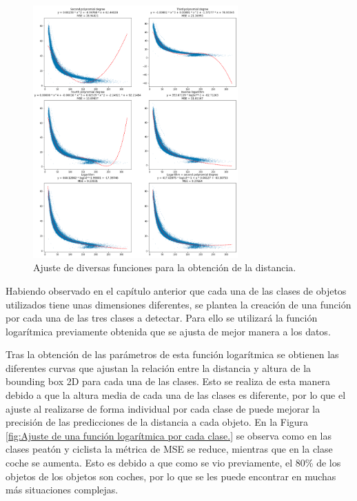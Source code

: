 \begin{figure}[H]
    \centering
    \includegraphics[width=0.7\textwidth]{Book/figures/6_approx_distancia/distance_regression_1_kitti1.png}
    \caption{Ajuste de diversas funciones para la obtención de la distancia.}
    \label{fig:Ajuste de diversas funciones para la obtención de la distancia.}
\end{figure}

Habiendo observado en el capítulo anterior que cada una de las clases de objetos utilizados tiene unas dimensiones diferentes, se plantea la creación de una función por cada una de las tres clases a detectar. Para ello se utilizará la función logarítmica previamente obtenida que se ajusta de mejor manera a los datos.

Tras la obtención de las parámetros de esta función logarítmica se obtienen las diferentes curvas que ajustan la relación entre la distancia y altura de la bounding box 2D para cada una de las clases. Esto se realiza de esta manera debido a que la altura media de cada una de las clases es diferente, por lo que el ajuste al realizarse de forma individual por cada clase de puede mejorar la precisión de las predicciones de la distancia a cada objeto. En la Figura \ref{fig:Ajuste de una función logarítmica por cada clase.} se observa como en las clases peatón y ciclista la métrica de \ac{MSE} se reduce, mientras que en la clase coche se aumenta. Esto es debido a que como se vio previamente, el 80\% de los objetos de los objetos son coches, por lo que se les puede encontrar en muchas más situaciones complejas.


